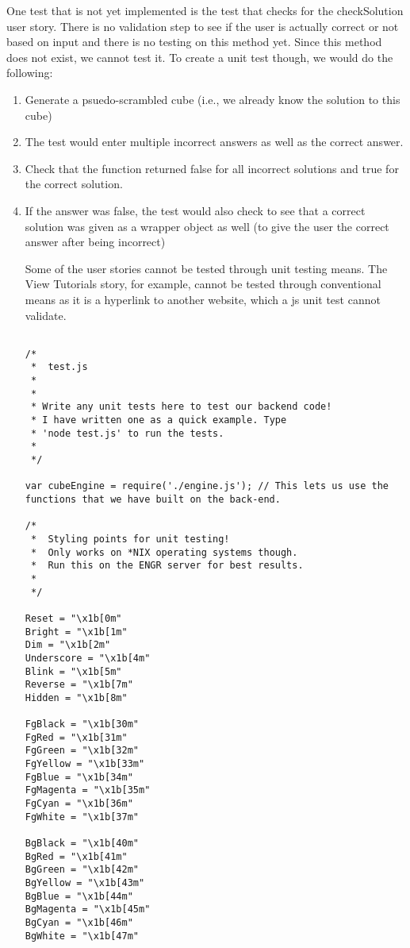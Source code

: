 \documentclass[12pt]{article}
\begin{document}
\par One test that is not yet implemented is the test that checks for the checkSolution user story. There is no validation step to see if the user is actually correct or not based on input and there is no testing on this method yet. Since this method does not exist, we cannot test it. To create a unit test though, we would do the following: \\

\begin{enumerate}
\item Generate a psuedo-scrambled cube (i.e., we already know the solution to this cube)
\item The test would enter multiple incorrect answers as well as the correct answer.
\item Check that the function returned false for all incorrect solutions and true for the correct solution.
\item If the answer was false, the test would also check to see that a correct solution was given as a wrapper object as well (to give the user the correct answer after being incorrect)

\par Some of the user stories cannot be tested through unit testing means. The View Tutorials story, for example, cannot be tested through conventional means as it is a hyperlink to another website, which a js unit test cannot validate. \\

\begin{verbatim}

/*
 *  test.js
 *
 *
 * Write any unit tests here to test our backend code!
 * I have written one as a quick example. Type
 * 'node test.js' to run the tests.
 *
 */

var cubeEngine = require('./engine.js'); // This lets us use the functions that we have built on the back-end.

/*
 *  Styling points for unit testing!
 *  Only works on *NIX operating systems though.
 *  Run this on the ENGR server for best results.
 *
 */

Reset = "\x1b[0m"
Bright = "\x1b[1m"
Dim = "\x1b[2m"
Underscore = "\x1b[4m"
Blink = "\x1b[5m"
Reverse = "\x1b[7m"
Hidden = "\x1b[8m"
 
FgBlack = "\x1b[30m"
FgRed = "\x1b[31m"
FgGreen = "\x1b[32m"
FgYellow = "\x1b[33m"
FgBlue = "\x1b[34m"
FgMagenta = "\x1b[35m"
FgCyan = "\x1b[36m"
FgWhite = "\x1b[37m"
 
BgBlack = "\x1b[40m"
BgRed = "\x1b[41m"
BgGreen = "\x1b[42m"
BgYellow = "\x1b[43m"
BgBlue = "\x1b[44m"
BgMagenta = "\x1b[45m"
BgCyan = "\x1b[46m"
BgWhite = "\x1b[47m"



\end{verbatim}
\end{enumerate}
\end{document}
